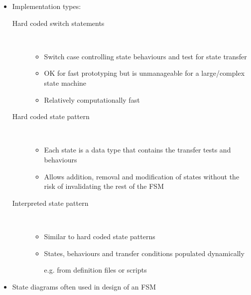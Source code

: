\documentclass[a4paper]{article}
\begin{document}
\begin{itemize}
  \item
    Implementation types:

    \begin{description}
      \item[Hard coded switch statements] \hfill \\
        \begin{itemize}
          \item
            Switch case controlling state behaviours and test for state transfer

          \item
            OK for fast prototyping but is unmanageable for a large/complex state
            machine

          \item
            Relatively computationally fast

        \end{itemize}

      \item[Hard coded state pattern] \hfill \\
        \begin{itemize}
          \item
            Each state is a data type that contains the transfer tests and
            behaviours

          \item
            Allows addition, removal and modification of states without the risk
            of invalidating the rest of the FSM

        \end{itemize}

      \item[Interpreted state pattern] \hfill \\
        \begin{itemize}
          \item
            Similar to hard coded state patterns

          \item
            States, behaviours and transfer conditions populated dynamically

            e.g. from definition files or scripts

        \end{itemize}

    \end{description}

  \item
    State diagrams often used in design of an FSM


\end{itemize}
\end{document}
